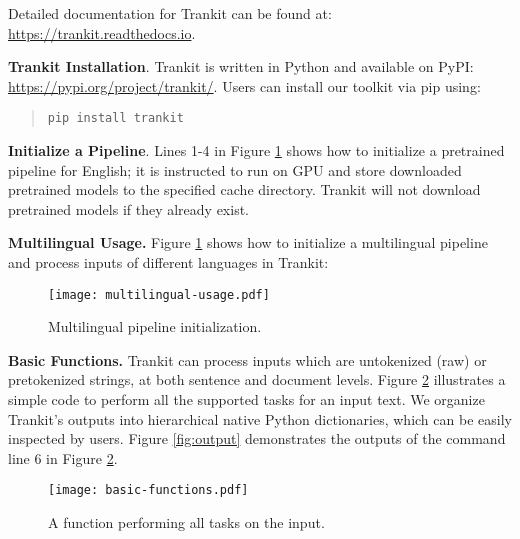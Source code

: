 \documentclass[11pt,a4paper]{article}
\begin{document}
Detailed documentation for Trankit can be found at: \url{https://trankit.readthedocs.io}.

\vspace{0.3cm}

\noindent \textbf{Trankit Installation}. Trankit is written in Python and available on PyPI: \url{https://pypi.org/project/trankit/}. Users can install our toolkit via pip using:


\begin{quote}
    \centering
    \texttt{pip install trankit}
\end{quote}

\noindent \textbf{Initialize a Pipeline}. Lines 1-4 in Figure \ref{fig:multilingual} shows how to initialize a pretrained pipeline for English; it is instructed to run on GPU and store downloaded pretrained models to the specified cache directory. Trankit will not download pretrained models if they already exist.













\vspace{0.3cm}

\noindent \textbf{Multilingual Usage.} Figure \ref{fig:multilingual} shows how to initialize a multilingual pipeline and process inputs of different languages in Trankit:
\begin{figure}[ht]
    \centering
    \texttt{[image: multilingual-usage.pdf]}
    \caption{Multilingual pipeline initialization.}
    \label{fig:multilingual}
\end{figure}





\vspace{0.3cm}

\noindent \textbf{Basic Functions.} Trankit can process inputs which are untokenized (raw) or pretokenized strings, at both sentence and document levels. Figure \ref{fig:basic} illustrates a simple code to perform all the supported tasks for an input text. We organize Trankit's outputs into hierarchical native Python dictionaries, which can be easily inspected by users. Figure \ref{fig:output} demonstrates the outputs of the command line $6$ in Figure \ref{fig:basic}.



\begin{figure}[ht]
    \centering
    \texttt{[image: basic-functions.pdf]}
    \caption{A function performing all tasks on the input.}
    \label{fig:basic}
\end{figure}
\end{document}
